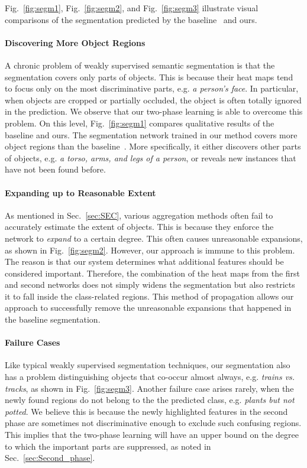 \documentclass[10pt,twocolumn,letterpaper]{article}
\newcommand{\figref}[1]{Fig.~\ref{#1}}
\newcommand{\secref}[1]{Sec.~\ref{#1}}
\begin{document}
\figref{fig:segm1}, \figref{fig:segm2}, and \figref{fig:segm3} illustrate visual comparisons of the segmentation predicted by the baseline~\cite{kolesnikov2016seed} and ours.

\paragraph{Discovering More Object Regions}\quad A chronic problem of weakly supervised semantic segmentation is that the segmentation covers only parts of objects. This is because their heat maps tend to focus only on the most discriminative parts, e.g. \textit{a person's face}. %
In particular, when objects are cropped or partially occluded, the object is often totally ignored in the prediction.
We observe that our two-phase learning is able to overcome this problem. On this level, \figref{fig:segm1} compares qualitative results of the baseline and ours. The segmentation network trained in our method covers more object regions than the baseline~\cite{kolesnikov2016seed}. More specifically, it either discovers other parts of objects, e.g. \textit{a torso, arms, and legs of a person}, or reveals new instances that have not been found before.

\paragraph{Expanding up to Reasonable Extent}\quad
As mentioned in \secref{sec:SEC}, various aggregation methods often fail to accurately estimate the extent of objects. This is because they enforce the network to \textit{expand} to a certain degree. This often causes unreasonable expansions, as shown in \figref{fig:segm2}. However, our approach is immune to this problem. The reason is that our system determines what additional features should be considered important. Therefore, the combination of the heat maps from the first and second networks does not simply widens the segmentation but also restricts it to fall inside the class-related regions. This method of propagation allows our approach to successfully remove the unreasonable expansions that happened in the baseline segmentation.

\paragraph{Failure Cases}\quad
Like typical weakly supervised segmentation techniques, our segmentation also has a problem distinguishing objects that co-occur almost always, e.g. \textit{trains vs. tracks}, as shown in \figref{fig:segm3}. Another failure case arises rarely, when the newly found regions do not belong to the the predicted class, e.g. \textit{plants but not potted}. We believe this is because the newly highlighted features in the second phase are sometimes not discriminative enough to exclude such confusing regions. This implies that the two-phase learning will have an upper bound on the degree to which the important parts are suppressed, as noted in \secref{sec:Second_phase}.
\end{document}
